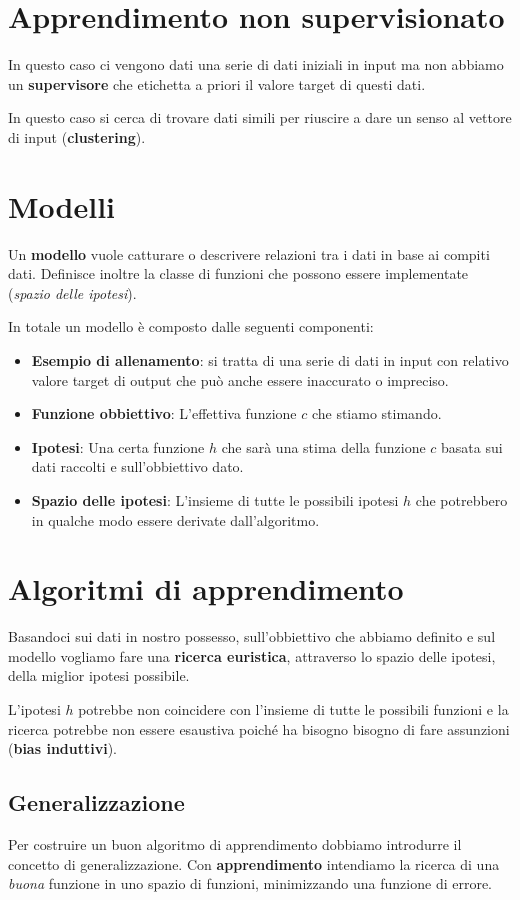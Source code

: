 \section{Apprendimento non supervisionato}
In questo caso ci vengono dati una serie di dati iniziali in input ma non abbiamo un \textbf{supervisore} che etichetta
a priori il valore target di questi dati.

In questo caso si cerca di trovare dati simili per riuscire a dare un senso al vettore di input (\textbf{clustering}).

\section{Modelli}
Un \textbf{modello} vuole catturare o descrivere relazioni tra i dati in base ai compiti dati. Definisce inoltre la classe
di funzioni che possono essere implementate (\emph{spazio delle ipotesi}).

In totale un modello \`e composto dalle seguenti componenti:
\begin{itemize}
	\item \textbf{Esempio di allenamento}: si tratta di una serie di dati in input con relativo valore target di output
	      che pu\`o anche essere inaccurato o impreciso.
	\item \textbf{Funzione obbiettivo}: L'effettiva funzione $c$ che stiamo stimando.
	\item \textbf{Ipotesi}: Una certa funzione $h$ che sar\`a una stima della funzione $c$ basata sui dati raccolti e
	      sull'obbiettivo dato.
	\item \textbf{Spazio delle ipotesi}: L'insieme di tutte le possibili ipotesi $h$ che potrebbero in qualche modo essere
	      derivate dall'algoritmo.
\end{itemize}

\section{Algoritmi di apprendimento}
Basandoci sui dati in nostro possesso, sull'obbiettivo che abbiamo definito e sul modello vogliamo fare una
\textbf{ricerca euristica}, attraverso lo spazio delle ipotesi, della miglior ipotesi possibile.

L'ipotesi $h$ potrebbe non coincidere con l'insieme di tutte le possibili funzioni e la ricerca potrebbe non essere
esaustiva poich\'e ha bisogno bisogno di fare assunzioni (\textbf{bias induttivi}).

\subsection{Generalizzazione}
Per costruire un buon algoritmo di apprendimento dobbiamo introdurre il concetto di generalizzazione. Con
\textbf{apprendimento} intendiamo la ricerca di una \emph{buona} funzione in uno spazio di funzioni, minimizzando una
funzione di errore.

